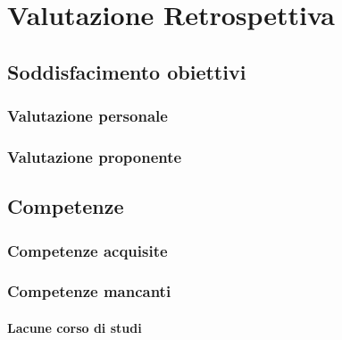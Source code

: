 
\chapter{Valutazione Retrospettiva}
\label{cap:valutazione-retrospettiva}

\section{Soddisfacimento obiettivi}
\subsection{Valutazione personale}
\subsection{Valutazione proponente}

\section{Competenze}
\subsection{Competenze acquisite}
\subsection{Competenze mancanti}
\subsubsection{Lacune corso di studi}
